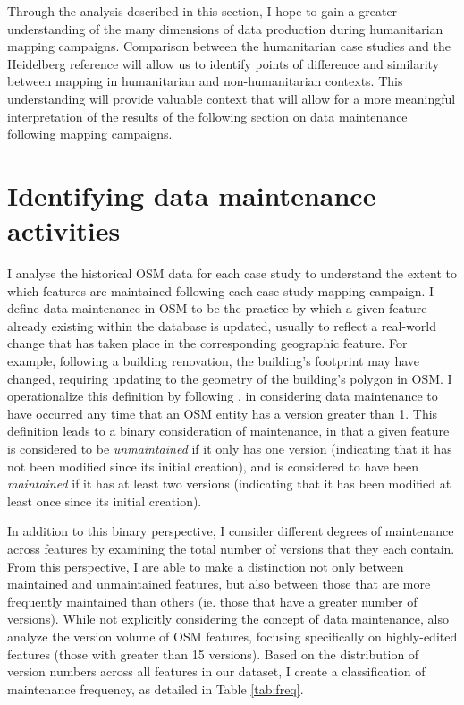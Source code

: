 Through the analysis described in this section, I hope to gain a greater understanding of the many dimensions of data production during humanitarian mapping campaigns. Comparison between the humanitarian case studies and the Heidelberg reference will allow us to identify points of difference and similarity between mapping in humanitarian and non-humanitarian contexts. This understanding will provide valuable context that will allow for a more meaningful interpretation of the results of the following section on data maintenance following mapping campaigns.

\section{Identifying data maintenance activities}
\label{sec-maint}

I analyse the historical OSM data for each case study to understand the extent to which features are maintained following each case study mapping campaign. I define data maintenance in OSM to be the practice by which a given feature already existing within the database is updated, usually to reflect a real-world change that has taken place in the corresponding geographic feature.  For example, following a building renovation, the building's footprint may have changed, requiring updating to the geometry of the building's polygon in OSM. 
I operationalize this definition by following \textcite{quattrone_work_2017}, in considering data maintenance to have occurred any time that an OSM entity has a version greater than 1. This definition leads to a binary consideration of maintenance, in that a given feature is considered to be \textit{unmaintained} if it only has one version (indicating that it has not been modified since its initial creation), and is considered to have been \textit{maintained} if it has at least two versions (indicating that it has been modified at least once since its initial creation).  

In addition to this binary perspective, I consider different degrees of maintenance across features by examining the total number of versions that they each contain. From this perspective, I are able to make a distinction not only between maintained and unmaintained features, but also between those that are more frequently maintained than others (ie. those that have a greater number of versions). While not explicitly considering the concept of data maintenance, \textcite{mooney_characteristics_2012} also analyze the version volume of OSM features, focusing specifically on highly-edited features (those with greater than 15 versions). Based on the distribution of version numbers across all features in our dataset, I create a classification of maintenance frequency, as detailed in Table \ref{tab:freq}. 

